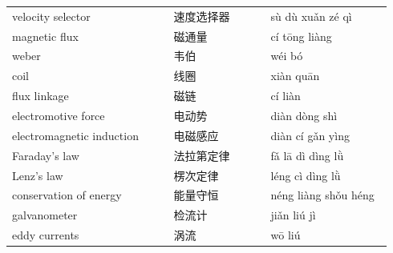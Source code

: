 \documentclass[11pt]{article}
\begin{document}
\begin{longtable}{@{}p{0.40\linewidth}p{0.24\linewidth}p{0.30\linewidth}@{}}
velocity selector & 速度选择器 & sù dù xuǎn zé qì \\
magnetic flux & 磁通量 & cí tōng liàng \\
weber & 韦伯 & wéi bó \\
coil & 线圈 & xiàn quān \\
flux linkage & 磁链 & cí liàn \\
electromotive force & 电动势 & diàn dòng shì \\
electromagnetic induction & 电磁感应 & diàn cí gǎn yìng \\
Faraday's law & 法拉第定律 & fǎ lā dì dìng lǜ \\
Lenz's law & 楞次定律 & léng cì dìng lǜ \\
conservation of energy & 能量守恒 & néng liàng shǒu héng \\
galvanometer & 检流计 & jiǎn liú jì \\
eddy currents & 涡流 & wō liú \\
\end{longtable}
\end{document}
